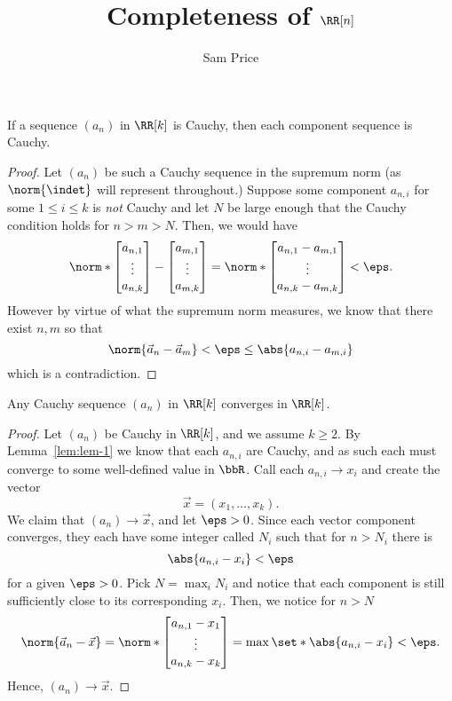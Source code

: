 \documentclass{article}
\author{Sam Price}
\date{}
\title{Completeness of $\RR[n]$}
\begin{document}
\maketitle

\begin{lemma}\label{lem:lem-1}
  If a sequence $(a_{n})$ in $\RR[k]$ is Cauchy, then each component sequence is Cauchy.
\end{lemma}
\begin{proof}
  Let $(a_{n})$ be such a Cauchy sequence in the supremum norm (as $\norm{\indet}$ will represent throughout.)
  Suppose some component $a_{n,i}$ for some $1 \le i \le k$ is \emph{not} Cauchy and let $N$ be large enough
  that the Cauchy condition holds for $n > m > N$.
  Then, we would have
  \[
    \norm*{\begin{bmatrix} a_{n,1} \\ \vdots \\ a_{n, k}\end{bmatrix} - \begin{bmatrix} a_{m,1} \\ \vdots \\ a_{m,k} \end{bmatrix}}
    = \norm*{\begin{bmatrix}a_{n,1} - a_{m,1} \\ \vdots \\ a_{n,k} - a_{m,k}\end{bmatrix}} < \eps.
  \]
  However by virtue of what the supremum norm measures, we know that there exist $n, m$ so that
  \[ \norm{\vec{a}_{n} - \vec{a}_{m}} < \eps \le \abs{a_{n,i} - a_{m,i}} \]
  which is a contradiction.
\end{proof}

\begin{theorem}
  Any Cauchy sequence $(a_{n})$ in $\RR[k]$ converges in $\RR[k]$.
\end{theorem}

\begin{proof}
  Let $(a_{n})$ be Cauchy in $\RR[k]$, and we assume $k \ge 2$.
  By Lemma~\ref{lem:lem-1} we know that each $a_{n,i}$ are Cauchy, and as such each must converge
  to some well-defined value in $\bbR$. Call each $a_{n,i} \to x_{i}$ and create the vector
  \[ \vec{x} = (x_{1}, \ldots, x_{k}). \]
  We claim that $(a_{n}) \to \vec{x}$, and let $\eps > 0$.
  Since each vector component converges, they each have some integer called $N_{i}$ such that for $n > N_{i}$
  there is \[ \abs{a_{n,i} - x_{i}} < \eps \] for a given $\eps > 0$.
  Pick $N = \max_{i} N_{i}$ and notice that each component is still sufficiently close to its corresponding $x_{i}$.
  Then, we notice for $n > N$
  \[ \norm{\vec{a}_{n} - \vec{x}}=
    \norm*{\begin{bmatrix}
      a_{n,1} - x_{1}\\
      \vdots \\
      a_{n,k} - x_{k}
    \end{bmatrix}} = \max\set*{\abs{a_{n,i} - x_{i}}} < \eps.
  \]
  Hence, $(a_{n}) \to \vec{x}$.
\end{proof}
\end{document}
